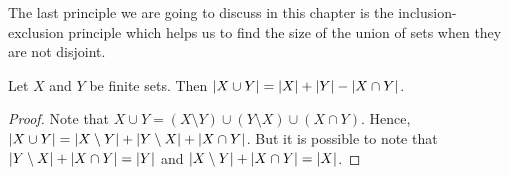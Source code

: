 The last principle we are going to discuss in this chapter is the
inclusion-exclusion principle which helps us to find the size of the union
of sets when they are not disjoint.
\begin{theorem}
\label{theorem:inclusion-exclusion-principle}
  Let $X$ and $Y$ be finite sets. Then $\left|{X \cup Y}\right| = \left|{X}\right|
  + \left|{Y}\right| - \left|{X \cap Y}\right|$.
\end{theorem}
\begin{proof}
  Note that $X \cup Y = (X \setminus Y) \cup (Y \setminus X) \cup (X \cap Y)$.
  Hence, $\left|{X \cup Y}\right| = \left|{X \setminus Y}\right| + 
  \left|{Y \setminus X}\right| + \left|{X \cap Y}\right|$. But it
  is possible to note that $\left|{Y \setminus X}\right| + \left|{X \cap Y}\right|
  = \left|{Y}\right|$ and $\left|{X \setminus Y}\right| + \left|{X \cap Y}\right| =
  \left|{X}\right|$.
\end{proof}

